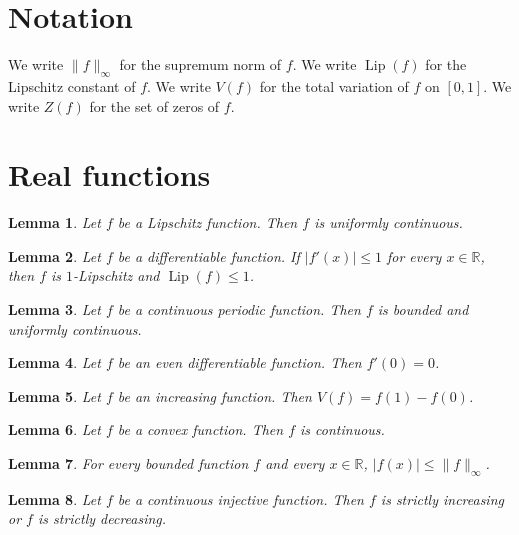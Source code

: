 \documentclass{article}
\newtheorem{lemma}{Lemma}
\begin{document}
\section{Notation}

We write $\|f\|_\infty$ for the supremum norm of $f$.
We write $\operatorname{Lip}(f)$ for the Lipschitz constant of $f$.
We write $V(f)$ for the total variation of $f$ on $[0,1]$.
We write $Z(f)$ for the set of zeros of $f$.

\section{Real functions}

\begin{lemma}\label{lipschitz}
Let $f$ be a Lipschitz function. Then $f$ is uniformly continuous.
\end{lemma}

\begin{lemma}\label{derivative}
Let $f$ be a differentiable function. If $|f'(x)|\le1$ for every $x\in\mathbb{R}$, then $f$ is $1$-Lipschitz and $\operatorname{Lip}(f)\le1$.
\end{lemma}

\begin{lemma}\label{periodic}
Let $f$ be a continuous periodic function. Then $f$ is bounded and uniformly continuous.
\end{lemma}

\begin{lemma}\label{even}
Let $f$ be an even differentiable function. Then $f'(0)=0$.
\end{lemma}

\begin{lemma}\label{monotone}
Let $f$ be an increasing function. Then $V(f)=f(1)-f(0)$.
\end{lemma}

\begin{lemma}\label{convex}
Let $f$ be a convex function. Then $f$ is continuous.
\end{lemma}

\begin{lemma}\label{bounded}
For every bounded function $f$ and every $x\in\mathbb{R}$, $|f(x)|\le\|f\|_\infty$.
\end{lemma}

\begin{lemma}\label{injective}
Let $f$ be a continuous injective function. Then $f$ is strictly increasing or $f$ is strictly decreasing.
\end{lemma}
\end{document}

